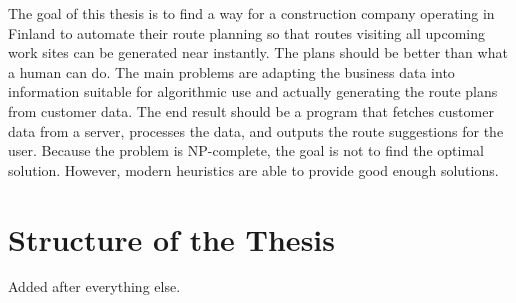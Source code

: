 The goal of this thesis is to find a way for a construction company operating in Finland to automate their route planning so that routes visiting all upcoming work sites can be generated near instantly. The plans should be better than what a human can do. The main problems are adapting the business data into information suitable for algorithmic use and actually generating the route plans from customer data. The end result should be a program that fetches customer data from a server, processes the data, and outputs the route suggestions for the user. Because the problem is NP-complete, the goal is not to find the optimal solution. However, modern heuristics are able to provide good enough solutions. 




\section{Structure of the Thesis}
Added after everything else.